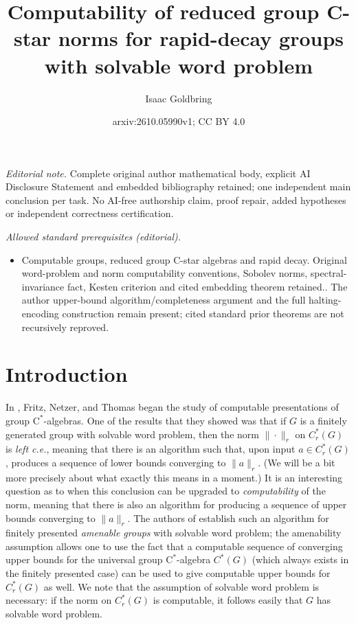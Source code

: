 \documentclass[10pt,a4paper]{amsart}
\title{Computability of reduced group C-star norms for rapid-decay groups with solvable word problem}
\author{Isaac Goldbring}
\date{arxiv:2610.05990v1; CC BY 4.0}
\newcommand{\cstar}{$\mathrm{C}^*$}
\theoremstyle{plain}
\theoremstyle{definition}
\numberwithin{equation}{section}
\begin{document}
\maketitle
\noindent\textit{Editorial note.} Complete original author mathematical body, explicit AI Disclosure Statement and embedded bibliography retained; one independent main conclusion per task. No AI-free authorship claim, proof repair, added hypotheses or independent correctness certification.\par\medskip
\noindent\textit{Allowed standard prerequisites (editorial).}\begin{itemize}
\item Computable groups, reduced group C-star algebras and rapid decay. Original word-problem and norm computability conventions, Sobolev norms, spectral-invariance fact, Kesten criterion and cited embedding theorem retained.. The author upper-bound algorithm/completeness argument and the full halting-encoding construction remain present; cited standard prior theorems are not recursively reproved.
\end{itemize}\medskip
\section{Introduction}\label{sec:Intro}

In \cite{canyou}, Fritz, Netzer, and Thomas began the study of computable presentations of group \cstar-algebras.  One of the results that they showed was that if $G$ is a finitely generated group with solvable word problem, then the norm $\|\cdot\|_r$ on $C^*_r(G)$ is \emph{left c.e.}, meaning that there is an algorithm such that, upon input $a\in C^*_r(G)$, produces a sequence of lower bounds converging to $\|a\|_r$.  (We will be a bit more precisely about what exactly this means in a moment.)  It is an interesting question as to when this conclusion can be upgraded to \emph{computability} of the norm, meaning that there is also an algorithm for producing a sequence of upper bounds converging to $\|a\|_r$.  The authors of \cite{canyou} establish such an algorithm for finitely presented \emph{amenable groups} with solvable word problem; the amenability assumption allows one to use the fact that a computable sequence of converging upper bounds for the universal group \cstar-algebra $C^*(G)$ (which always exists in the finitely presented case) can be used to give computable upper bounds for $C^*_r(G)$ as well.  We note that the assumption of solvable word problem is necessary:  if the norm on $C^*_r(G)$ is computable, it follows easily that $G$ has solvable word problem.  
\end{document}
